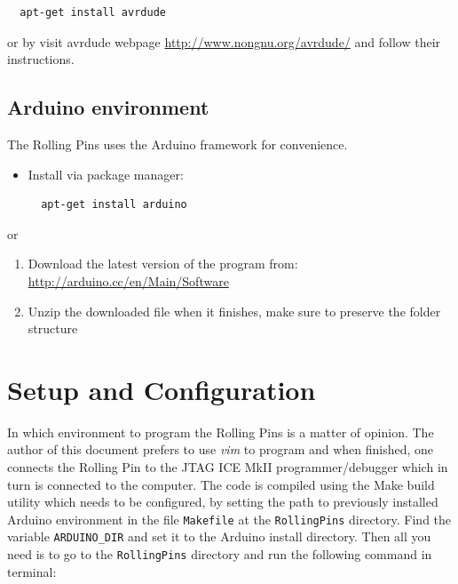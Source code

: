 \documentclass[a4paper, twoside, final]{book}%
\begin{document}
\begin{lstlisting}
  apt-get install avrdude
\end{lstlisting}
or by visit avrdude webpage \url{http://www.nongnu.org/avrdude/} and follow their instructions.

\subsection*{\bf Arduino environment}
The Rolling Pins uses the Arduino framework for convenience.
\begin{itemize}
  \item Install via package manager:
\begin{lstlisting}
  apt-get install arduino
\end{lstlisting}
\end{itemize}
or 
\begin{enumerate}
  \item Download the latest version of the program from: \\
  \url{http://arduino.cc/en/Main/Software}
  \item Unzip the downloaded file when it finishes, make sure to preserve the folder structure
\end{enumerate}

\newpage

\section{Setup and Configuration}

In which environment to program the Rolling Pins is a matter of opinion. The author of this document prefers to use \emph{vim} to program and when finished, one connects the Rolling Pin to the JTAG ICE MkII programmer/debugger which in turn is connected to the computer. The code is compiled using the Make build utility which needs to be configured, by setting the path to previously installed Arduino environment in the file {\tt Makefile} at the {\tt RollingPins} directory. Find the variable {\tt ARDUINO\_DIR} and set it to the Arduino install directory. Then all you need is to go to the {\tt RollingPins} directory and run the following command in terminal:
\end{document}

